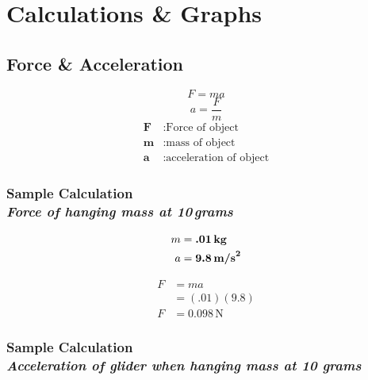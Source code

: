 
\section{Calculations \& Graphs}

\vspace{-0.5cm}
\singlespacing


\subsection{Force \& Acceleration} 

{\centering
\begin{equation}
	F = ma 
	\label{eq:NetForce}
\end{equation}
\begin{equation}
	a = \frac{F}{m} 
	\label{eq:CalcAcc}
\end{equation}
\begin{align*}
	\boldsymbol{F} &: \text{Force of object} \\
	\boldsymbol{m} &: \text{mass of object} \\
	\boldsymbol{a} &: \text{acceleration of object}
\end{align*}}

\subsubsection{Sample Calculation \\ {\normalfont \small\textit{Force of hanging mass at 10\,grams}}}

{\centering
{}
\begin{align*}
	m &= \boldsymbol{.01\,\text{\textbf{kg}}} \\
	a &= \boldsymbol{9.8\,\text{\textbf{m/s}}^2}
\end{align*}

\begin{align*}
	F &= ma \\
	&= (.01)(9.8) \\
	F &= \boxed{0.098\,\text{N}}
\end{align*}}

\subsubsection{Sample Calculation \\ {\normalfont \small\textit{Acceleration of glider when hanging mass at 10 grams}}}

